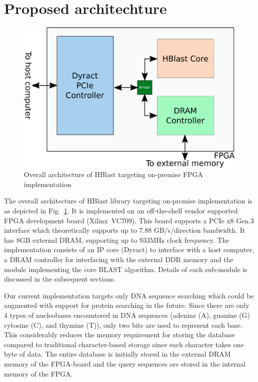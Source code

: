 \section{Proposed architechture}
\label{sec:propesedArch}

\begin{figure}[t!]
\centering
\includegraphics[width=0.9\columnwidth]{Figures/sysArch.pdf}
\caption{Overall architecture of HBlast targeting on-premise FPGA implementation} \label{fig:sysArch}
\end{figure}

The overall architecture of HBlast library targeting on-premise implementation is as depicted in Fig.~\ref{fig:sysArch}.
It is implemented on an off-the-shelf vendor supported FPGA development board (Xilinx~VC709).
This board supports a PCIe x8 Gen.3 interface which theoretically supports up to 7.88 GB/s/direction bandwidth.
It has 8GB external DRAM, supporting up to 933MHz clock frequency.
The implementation consists of an IP core (Dyract) to interface with a host computer, a DRAM controller for interfacing with the external DDR memory and the module implementing the core BLAST algorithm.
Details of each sub-module is discussed in the subsequent sections.

Our current implementation targets only DNA sequence searching which could be augmented with support for protein searching in the future.
Since there are only 4 types of nucleobases encountered in DNA sequences (adenine (A), guanine (G) cytosine (C), and thymine (T)), only two bits are used to represent each base.
This considerably reduces the memory requirement for storing the database compared to traditional character-based storage since each character takes one byte of data.
The entire database is initially stored in the external DRAM memory of the FPGA-board and the query sequences are stored in the internal memory of the FPGA.

